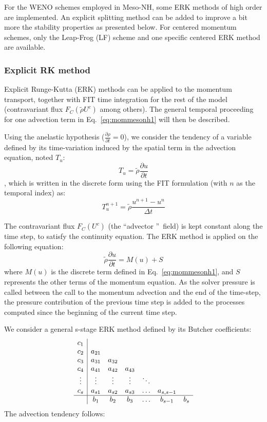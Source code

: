 For the WENO schemes employed in Meso-NH, some ERK methods of high order are implemented.
An explicit splitting method can be added to improve a bit more the stability properties as presented below.
For centered momentum schemes, only the Leap-Frog (LF) scheme and one specific centered ERK method are available.

\subsubsection{Explicit RK method}

Explicit Runge-Kutta (ERK) methods can be applied to the momentum transport, together with FIT time integration for the rest of the model (contravariant flux $F_C(\tilde{\rho}U^c)$ among others). The general temporal proceeding for one advection term in Eq.~\eqref{eq:mommesonh1}  will then be described.

Using the anelastic hypothesis ($\frac{\partial \rho}{\partial t} = 0$), we consider the tendency of a variable defined by its time-variation induced by the spatial term in the advection equation, noted $T_u$:
$$ T_u = \tilde{\rho} \frac{\partial u}{\partial t} $$,
which is written in the discrete form using the FIT formulation (with $n$ as the temporal index) as:
\begin{equation}
T_u^{n+1} = \tilde{\rho} \frac{u^{n+1}-u^{n}}{\Delta t}
\label{eq:tendency}
\end{equation}

The contravariant flux $F_C(U^c)$ (the \textquotedblleft advector \textquotedblright\ field) is kept constant along the time step, to satisfy the continuity equation. The ERK method is applied on the following equation:
\begin{equation}
\tilde{\rho} \frac{\partial u}{\partial t} = M(u) + S
\label{eq:semi-discr}
\end{equation}
where $M(u)$ is the discrete term defined in Eq.~\eqref{eq:mommesonh1}, and $S$ represents the other terms of the momentum equation. As the solver pressure is called between the call to the momentum advection and the end of the time-step, the pressure contribution of the previous time step is added to the processes computed since the beginning of the current time step. 

\noindent We consider a general s-stage ERK method defined by its Butcher coefficients:
\begin{displaymath}
\begin{array}{c|cccccc}
c_{1} &   &   &   &   &  & \\ 
c_{2} & a_{21} &   &   &   &   & \\
c_{3} & a_{31} & a_{32} &   &   &   & \\
c_{4} & a_{41} & a_{42} & a_{43} &   &   & \\ 
\vdots & \vdots & \vdots & \vdots & \ddots &    &  \\
c_{s} & a_{s1} & a_{s2} & a_{s3} & \ldots & a_{s,s-1} &  \\
\hline
      & b_{1} & b_{2} & b_{3} & \ldots & b_{s-1} & b_{s} 
\end{array}
\end{displaymath}
The advection tendency follows:

